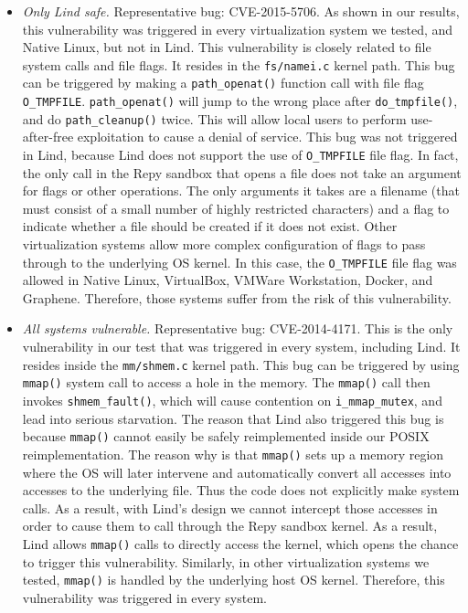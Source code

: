 \begin{itemize}
\item \emph{Only Lind safe.}  Representative bug: CVE-2015-5706. As 
shown in our results, this vulnerability was triggered in every 
virtualization system we tested, and Native Linux, but not in Lind. This vulnerability 
is closely related to file system calls and file flags. It resides in the \texttt{fs/namei.c} 
kernel path. This bug can be triggered by making a \texttt{path\_openat()} function 
call with file flag \texttt{O\_TMPFILE}. \texttt{path\_openat()} will jump to the wrong 
place after \texttt{do\_tmpfile()}, and do \texttt{path\_cleanup()} twice. This will 
allow local users to perform use-after-free exploitation to cause a denial of service. 
This bug was not triggered in Lind, because Lind does not support the use of 
\texttt{O\_TMPFILE} file flag. In fact, the only call in the Repy sandbox that
opens a file does not take an argument for flags or other operations.  The
only arguments it takes are a filename (that must consist of a small number
of highly restricted characters) and a flag to indicate whether a file should
be created if it does not exist.
Other virtualization systems allow more complex configuration of flags to 
pass through to the underlying OS kernel.   
In this case, the \texttt{O\_TMPFILE} file flag was 
allowed in Native Linux, VirtualBox, VMWare Workstation, Docker, and Graphene. Therefore, 
those systems suffer from the risk of this vulnerability.

\item \emph{All systems vulnerable.}  Representative bug: CVE-2014-4171. 
This is the only vulnerability in our test that was triggered in every 
system, including Lind. It resides inside the \texttt{mm/shmem.c} kernel path. This bug can 
be triggered by using \texttt{mmap()} system call to access a hole in the memory. 
The \texttt{mmap()} call then invokes \texttt{shmem\_fault()}, which will cause contention 
on \texttt{i\_mmap\_mutex}, and lead into serious starvation.  
The reason that Lind also triggered this bug is because \texttt{mmap()} cannot easily 
be safely reimplemented inside our POSIX reimplementation.  The reason why is
that \texttt{mmap()} sets up a memory region where the OS will later 
intervene and automatically convert all accesses into accesses to the
underlying file.  Thus the code does not explicitly make system calls.  As
a result, with Lind's design we cannot intercept those accesses in order
to cause them to call through the Repy sandbox kernel. As a result, 
Lind allows \texttt{mmap()} calls to directly access the kernel, which 
opens the chance to trigger this vulnerability. Similarly, in other 
virtualization systems we tested, \texttt{mmap()} is handled by the underlying
host OS kernel.  
Therefore, this vulnerability was 
triggered in every system. 


\end{itemize}
